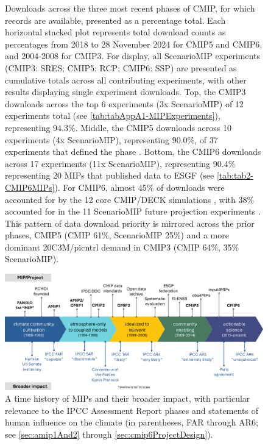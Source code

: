 \documentclass[manuscript]{copernicus}
\def\cred#1{{\color{red}#1}}
\begin{document}
\begin{figure}
    \centering
    
    \caption{Downloads across the three most recent phases of CMIP, for which records are available, presented as a percentage total. Each horizontal stacked plot represents total download counts as percentages from 2018 to \cred{28 November 2024} for CMIP5 and CMIP6, and 2004-2008 for CMIP3. For display, all ScenarioMIP experiments (CMIP3: SRES; CMIP5: RCP; CMIP6: SSP) are presented as cumulative totals across all contributing experiments, with other results displaying single experiment downloads. Top, the CMIP3 \citep{meehl_wcrp_2007} downloads across the top 6 experiments (3x ScenarioMIP) of 12 experiments total (see \autoref{tab:tabAppA1-MIPExperiments}), representing 94.3\%. Middle, the CMIP5 downloads across 10 experiments (4x ScenarioMIP), representing 90.0\%, of 37 experiments that defined the phase \citep[representing 8 MIPs identified in \autoref{tab:tabAppA1-MIPExperiments};][]{taylor_overview_2012}. Bottom, the CMIP6 downloads across 17 experiments (11x ScenarioMIP), representing 90.4\% representing 20 MIPs that published data to ESGF (see \autoref{tab:tab2-CMIP6MIPs}). For CMIP6, almost 45\% of downloads were accounted for by the 12 core CMIP/DECK simulations \citep{eyring_overview_2016}, with 38\% accounted for in the 11 ScenarioMIP future projection experiments \citep{oneill_scenario_2016}. This pattern of data download priority is mirrored across the prior phases, CMIP5 (CMIP 61\%, ScenarioMIP 25\%) and a more dominant 20C3M/picntrl demand in CMIP3 (CMIP 64\%, 35\% ScenarioMIP).}
    \label{fig:fig5-MIPDownloads}
\end{figure}


\begin{figure}
    \centering
    \includegraphics[width=\textwidth]{241126T171500_Fig6.pdf}
    \caption{A time history of MIPs and their broader impact, with particular relevance to the IPCC Assessment Report phases and statements of human influence on the climate (in parentheses, FAR through AR6; see \autoref{sec:amip1And2} through \autoref{sec:cmip6ProjectDesign}).}
    \label{fig:fig6-MIPImpact}
\end{figure}
\end{document}
